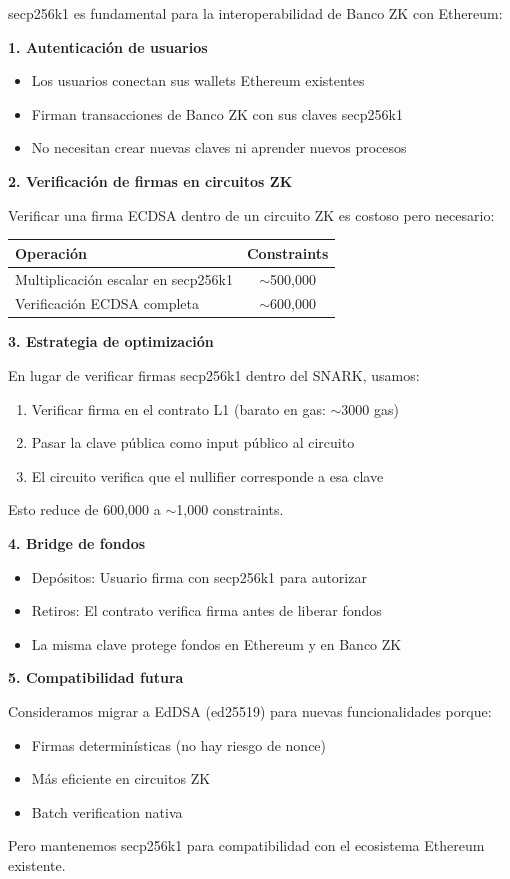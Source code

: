 \documentclass[11pt,a4paper,twoside,openright]{book}
\theoremstyle{definition}
\theoremstyle{plain}
\theoremstyle{remark}
\begin{document}
\begin{bancozk}
secp256k1 es fundamental para la interoperabilidad de Banco ZK con Ethereum:

\textbf{1. Autenticación de usuarios}
\begin{itemize}
    \item Los usuarios conectan sus wallets Ethereum existentes
    \item Firman transacciones de Banco ZK con sus claves secp256k1
    \item No necesitan crear nuevas claves ni aprender nuevos procesos
\end{itemize}

\textbf{2. Verificación de firmas en circuitos ZK}

Verificar una firma ECDSA dentro de un circuito ZK es costoso pero necesario:
\begin{center}
\begin{tabular}{lc}
\toprule
\textbf{Operación} & \textbf{Constraints} \\
\midrule
Multiplicación escalar en secp256k1 & $\sim$500,000 \\
Verificación ECDSA completa & $\sim$600,000 \\
\bottomrule
\end{tabular}
\end{center}

\textbf{3. Estrategia de optimización}

En lugar de verificar firmas secp256k1 dentro del SNARK, usamos:
\begin{enumerate}
    \item Verificar firma en el contrato L1 (barato en gas: $\sim$3000 gas)
    \item Pasar la clave pública como input público al circuito
    \item El circuito verifica que el nullifier corresponde a esa clave
\end{enumerate}

Esto reduce de 600,000 a $\sim$1,000 constraints.

\textbf{4. Bridge de fondos}
\begin{itemize}
    \item Depósitos: Usuario firma con secp256k1 para autorizar
    \item Retiros: El contrato verifica firma antes de liberar fondos
    \item La misma clave protege fondos en Ethereum y en Banco ZK
\end{itemize}

\textbf{5. Compatibilidad futura}

Consideramos migrar a EdDSA (ed25519) para nuevas funcionalidades porque:
\begin{itemize}
    \item Firmas determinísticas (no hay riesgo de nonce)
    \item Más eficiente en circuitos ZK
    \item Batch verification nativa
\end{itemize}

Pero mantenemos secp256k1 para compatibilidad con el ecosistema Ethereum existente.
\end{bancozk}
\end{document}
